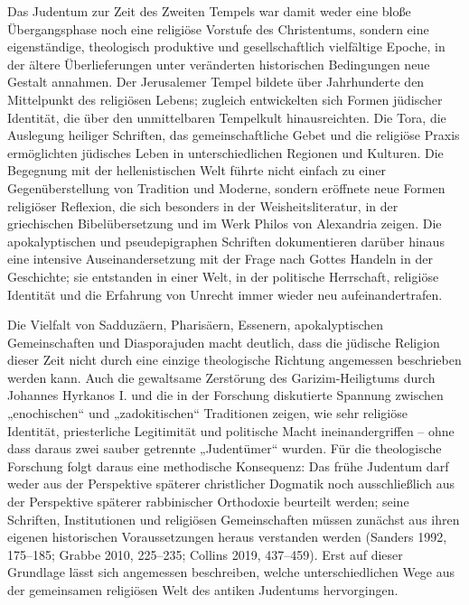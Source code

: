 \documentclass[fontsize=12pt]{mybib}
\begin{document}
Das Judentum zur Zeit des Zweiten Tempels war damit weder eine bloße Übergangsphase noch eine religiöse Vorstufe des Christentums, sondern eine eigenständige, theologisch produktive und gesellschaftlich vielfältige Epoche, in der ältere Überlieferungen unter veränderten historischen Bedingungen neue Gestalt annahmen. Der Jerusalemer Tempel bildete über Jahrhunderte den Mittelpunkt des religiösen Lebens; zugleich entwickelten sich Formen jüdischer Identität, die über den unmittelbaren Tempelkult hinausreichten. Die Tora, die Auslegung heiliger Schriften, das gemeinschaftliche Gebet und die religiöse Praxis ermöglichten jüdisches Leben in unterschiedlichen Regionen und Kulturen. Die Begegnung mit der hellenistischen Welt führte nicht einfach zu einer Gegenüberstellung von Tradition und Moderne, sondern eröffnete neue Formen religiöser Reflexion, die sich besonders in der Weisheitsliteratur, in der griechischen Bibelübersetzung und im Werk Philos von Alexandria zeigen. Die apokalyptischen und pseudepigraphen Schriften dokumentieren darüber hinaus eine intensive Auseinandersetzung mit der Frage nach Gottes Handeln in der Geschichte; sie entstanden in einer Welt, in der politische Herrschaft, religiöse Identität und die Erfahrung von Unrecht immer wieder neu aufeinandertrafen.

Die Vielfalt von Sadduzäern, Pharisäern, Essenern, apokalyptischen Gemeinschaften und Diasporajuden macht deutlich, dass die jüdische Religion dieser Zeit nicht durch eine einzige theologische Richtung angemessen beschrieben werden kann. Auch die gewaltsame Zerstörung des Garizim-Heiligtums durch Johannes Hyrkanos I. und die in der Forschung diskutierte Spannung zwischen „enochischen“ und „zadokitischen“ Traditionen zeigen, wie sehr religiöse Identität, priesterliche Legitimität und politische Macht ineinandergriffen – ohne dass daraus zwei sauber getrennte „Judentümer“ wurden. Für die theologische Forschung folgt daraus eine methodische Konsequenz: Das frühe Judentum darf weder aus der Perspektive späterer christlicher Dogmatik noch ausschließlich aus der Perspektive späterer rabbinischer Orthodoxie beurteilt werden; seine Schriften, Institutionen und religiösen Gemeinschaften müssen zunächst aus ihren eigenen historischen Voraussetzungen heraus verstanden werden (Sanders 1992, 175–185; Grabbe 2010, 225–235; Collins 2019, 437–459). Erst auf dieser Grundlage lässt sich angemessen beschreiben, welche unterschiedlichen Wege aus der gemeinsamen religiösen Welt des antiken Judentums hervorgingen.
\end{document}

